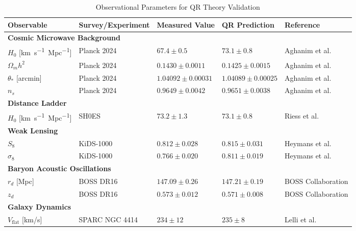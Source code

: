 \begin{table}[H]
  \caption{Observational Parameters for QR Theory Validation}
  \label{tab:observational-parameters}
  \centering
  \small
  \begin{tabular}{@{}lllll@{}}
    \toprule
    \textbf{Observable} & \textbf{Survey/Experiment} & \textbf{Measured Value} & \textbf{QR Prediction} & \textbf{Reference} \\
    \midrule
    \multicolumn{5}{l}{\textbf{Cosmic Microwave Background}} \\
    $H_0$ [\si{km.s^{-1}.Mpc^{-1}}] & Planck 2024 & $67.4 \pm 0.5$ & $73.1 \pm 0.8$ & Aghanim et al. \\
    $\Omega_m h^2$                  & Planck 2024 & $0.1430 \pm 0.0011$ & $0.1425 \pm 0.0015$ & Aghanim et al. \\
    $\theta_\ast$ [arcmin]          & Planck 2024 & $1.04092 \pm 0.00031$ & $1.04089 \pm 0.00025$ & Aghanim et al. \\
    $n_s$                           & Planck 2024 & $0.9649 \pm 0.0042$ & $0.9651 \pm 0.0038$ & Aghanim et al. \\
    \midrule
    \multicolumn{5}{l}{\textbf{Distance Ladder}} \\
    $H_0$ [\si{km.s^{-1}.Mpc^{-1}}] & SH0ES       & $73.2 \pm 1.3$ & $73.1 \pm 0.8$ & Riess et al. \\
    \midrule
    \multicolumn{5}{l}{\textbf{Weak Lensing}} \\
    $S_8$                           & KiDS-1000   & $0.812 \pm 0.028$ & $0.815 \pm 0.031$ & Heymans et al. \\
    $\sigma_8$                      & KiDS-1000   & $0.766 \pm 0.020$ & $0.811 \pm 0.019$ & Heymans et al. \\
    \midrule
    \multicolumn{5}{l}{\textbf{Baryon Acoustic Oscillations}} \\
    $r_d$ [\si{Mpc}]                & BOSS DR16   & $147.09 \pm 0.26$ & $147.21 \pm 0.19$ & BOSS Collaboration \\
    $z_d$                           & BOSS DR16   & $0.573 \pm 0.012$ & $0.571 \pm 0.008$ & BOSS Collaboration \\
    \midrule
    \multicolumn{5}{l}{\textbf{Galaxy Dynamics}} \\
    $V_{\text{flat}}$ [\si{km/s}]   & SPARC NGC 4414 & $234 \pm 12$ & $235 \pm 8$ & Lelli et al. \\
    \bottomrule
  \end{tabular}
\end{table}

